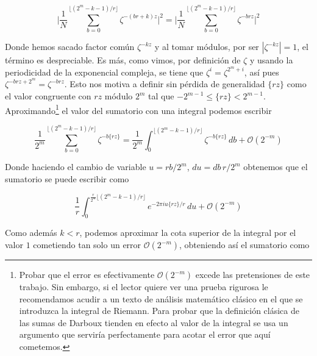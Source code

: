 \documentclass[11pt, spanish]{report}
\numberwithin{equation}{section}
\numberwithin{defin}{section}
\begin{document}
\begin{equation}
\Bigg|\frac{1}{N}\sum_{b=0}^{\lfloor (2^m-k-1)/r \rfloor}\zeta^{-(br+k)z}\Bigg|^2=\Bigg|\frac{1}{N}\sum_{b=0}^{\lfloor (2^m-k-1)/r \rfloor}\zeta^{-brz}\Bigg|^2
\end{equation}

Donde hemos sacado factor común $\zeta^{-kz}$ y al tomar módulos, por ser $|\zeta^{-kz}|=1$, el término es despreciable. Es más, como vimos, por definición de $\zeta$ y usando la periodicidad de la exponencial compleja, se tiene que $\zeta^i=\zeta^{2^m+i}$, así pues $\zeta^{-brz+2^m}=\zeta^{-brz}$. Esto nos motiva a definir sin pérdida de generalidad $\{rz\}$ como el valor congruente con $rz$ módulo $2^m$ tal que $-2^{m-1}\leq\{rz\}<2^{m-1}$.\\

Aproximando\footnote{Probar que el error es efectivamente $\mathcal{O}(2^{-m})$ excede las pretensiones de este trabajo. Sin embargo, si el lector quiere ver una prueba rigurosa le recomendamos acudir a un texto de análisis matemático clásico en el que se introduzca la integral de Riemann. Para probar que la definición clásica de las sumas de Darboux tienden en efecto al valor de la integral se usa un argumento que serviría perfectamente para acotar el error que aquí cometemos.} el valor del sumatorio con una integral podemos escribir

\begin{equation}
\frac{1}{2^m}\sum_{b=0}^{\lfloor (2^m-k-1)/r \rfloor}\zeta^{-b\{rz\}}=\frac{1}{2^m}\int_{0}^{\lfloor (2^m-k-1)/r \rfloor}\zeta^{-b\{rz\}}\,db+\mathcal{O}(2^{-m})
\end{equation}

Donde haciendo el cambio de variable $u=rb/2^m$, $du=db\,r/2^m$ obtenemos que el sumatorio se puede escribir como

\begin{equation}
\frac{1}{r}\int_{0}^{\frac{r}{2^m}\lfloor (2^m-k-1)/r \rfloor}e^{-2\pi i u \{rz\}/r}\,du+\mathcal{O}(2^{-m})
\end{equation}

Como además $k<r$, podemos aproximar la cota superior de la integral por el valor $1$ cometiendo\footnotemark{} tan solo un error $\mathcal{O}(2^{-m})$, obteniendo así el sumatorio como


\end{document}
